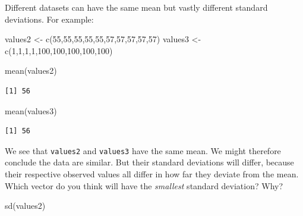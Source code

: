 \documentclass[
  letterpaper,
  DIV=11,
  numbers=noendperiod]{scrartcl}
\newenvironment{Shaded}{\begin{snugshade}}{\end{snugshade}}
\newcommand{\DecValTok}[1]{\textcolor[rgb]{0.68,0.00,0.00}{#1}}
\newcommand{\FunctionTok}[1]{\textcolor[rgb]{0.28,0.35,0.67}{#1}}
\newcommand{\NormalTok}[1]{\textcolor[rgb]{0.00,0.23,0.31}{#1}}
\newcommand{\OtherTok}[1]{\textcolor[rgb]{0.00,0.23,0.31}{#1}}
\begin{document}
Different datasets can have the same mean but vastly different standard
deviations. For example:

\begin{Shaded}
\begin{Highlighting}[]
\NormalTok{values2 }\OtherTok{\textless{}{-}} \FunctionTok{c}\NormalTok{(}\DecValTok{55}\NormalTok{,}\DecValTok{55}\NormalTok{,}\DecValTok{55}\NormalTok{,}\DecValTok{55}\NormalTok{,}\DecValTok{55}\NormalTok{,}\DecValTok{57}\NormalTok{,}\DecValTok{57}\NormalTok{,}\DecValTok{57}\NormalTok{,}\DecValTok{57}\NormalTok{,}\DecValTok{57}\NormalTok{)}
\NormalTok{values3 }\OtherTok{\textless{}{-}} \FunctionTok{c}\NormalTok{(}\DecValTok{1}\NormalTok{,}\DecValTok{1}\NormalTok{,}\DecValTok{1}\NormalTok{,}\DecValTok{1}\NormalTok{,}\DecValTok{100}\NormalTok{,}\DecValTok{100}\NormalTok{,}\DecValTok{100}\NormalTok{,}\DecValTok{100}\NormalTok{,}\DecValTok{100}\NormalTok{)}
\end{Highlighting}
\end{Shaded}

\begin{Shaded}
\begin{Highlighting}[]
\FunctionTok{mean}\NormalTok{(values2)}
\end{Highlighting}
\end{Shaded}

\begin{verbatim}
[1] 56
\end{verbatim}

\begin{Shaded}
\begin{Highlighting}[]
\FunctionTok{mean}\NormalTok{(values3)}
\end{Highlighting}
\end{Shaded}

\begin{verbatim}
[1] 56
\end{verbatim}

We see that \texttt{values2} and \texttt{values3} have the same mean. We
might therefore conclude the data are similar. But their standard
deviations will differ, because their respective observed values all
differ in how far they deviate from the mean. Which vector do you think
will have the \emph{smallest} standard deviation? Why?

\begin{Shaded}
\begin{Highlighting}[]
\FunctionTok{sd}\NormalTok{(values2)}
\end{Highlighting}
\end{Shaded}
\end{document}
